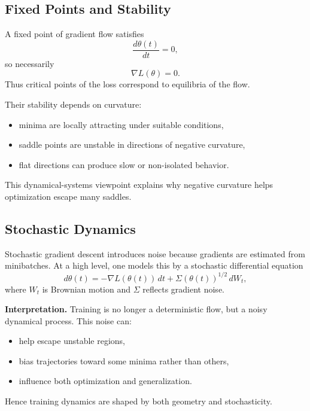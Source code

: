 \subsection{Fixed Points and Stability}

A fixed point of gradient flow satisfies
\[
\frac{d\theta(t)}{dt}=0,
\]
so necessarily
\[
\nabla L(\theta)=0.
\]
Thus critical points of the loss correspond to equilibria of the flow.

\medskip

\noindent
Their stability depends on curvature:
\begin{itemize}
    \item minima are locally attracting under suitable conditions,
    \item saddle points are unstable in directions of negative curvature,
    \item flat directions can produce slow or non-isolated behavior.
\end{itemize}

\medskip

\noindent
This dynamical-systems viewpoint explains why negative curvature helps optimization escape many saddles.

\subsection{Stochastic Dynamics}

Stochastic gradient descent introduces noise because gradients are estimated from minibatches. At a high level, one models this by a stochastic differential equation
\[
d\theta(t) = -\nabla L(\theta(t))\,dt + \Sigma(\theta(t))^{1/2}\,dW_t,
\]
where \(W_t\) is Brownian motion and \(\Sigma\) reflects gradient noise.

\medskip

\noindent
\textbf{Interpretation.}
Training is no longer a deterministic flow, but a noisy dynamical process. This noise can:
\begin{itemize}
    \item help escape unstable regions,
    \item bias trajectories toward some minima rather than others,
    \item influence both optimization and generalization.
\end{itemize}

\medskip

\noindent
Hence training dynamics are shaped by both geometry and stochasticity.

